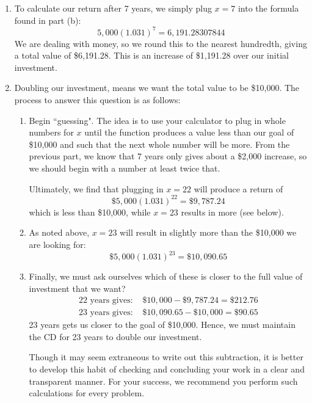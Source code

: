 \documentclass{ximera}
\begin{document}
\begin{explanation}
\begin{enumerate}
\item To calculate our return after 7 years, we simply plug $x=7$ into the formula found in part (b):
\begin{equation*}
5,000(1.031)^7 = 6,191.28307844
\end{equation*}
We are dealing with money, so we round this to the nearest hundredth, giving a total value of \$6,191.28. This is an increase of \$1,191.28 over our initial investment.

\item Doubling our investment, means we want the total value to be \$10,000. The process to answer this question is as follows:
\begin{enumerate}
\item Begin ``guessing". The idea is to use your calculator to plug in whole numbers for $x$ until the function produces a value less than our goal of \$10,000 and such that the next whole number will be more. From the previous part, we know that 7 years only gives about a \$2,000 increase, so we should begin with a number at least twice that.

Ultimately, we find that plugging in $x =22$ will produce a return of
%
\begin{equation*}
 \$5,000(1.031)^{22} = \$9,787.24
\end{equation*}
which is less than \$10,000, while $x= 23$ results in more (see below).

\item As noted above, $x=23$ will result in slightly more than the \$10,000 we are looking for:
%
\begin{equation*}
\$5,000(1.031)^{23} = \$10,090.65
\end{equation*}

\item Finally, we must ask ourselves which of these is closer to the full value of investment that we want? 
%
\begin{align*}
\text{22 years gives: } &\$10,000 - \$9,787.24 = \$212.76\\
\text{23 years gives: } &\$10,090.65 - \$10,000 = \$90.65
\end{align*}
%
23 years gets us closer to the goal of \$10,000. Hence, we must maintain the CD for 23 years to double our investment.

Though it may seem extraneous to write out this subtraction, it is better to develop this habit of checking and concluding your work in a clear and transparent manner. For your success, we recommend you perform such calculations for every problem.
\end{enumerate}

\end{enumerate}
\end{explanation}
\end{document}
